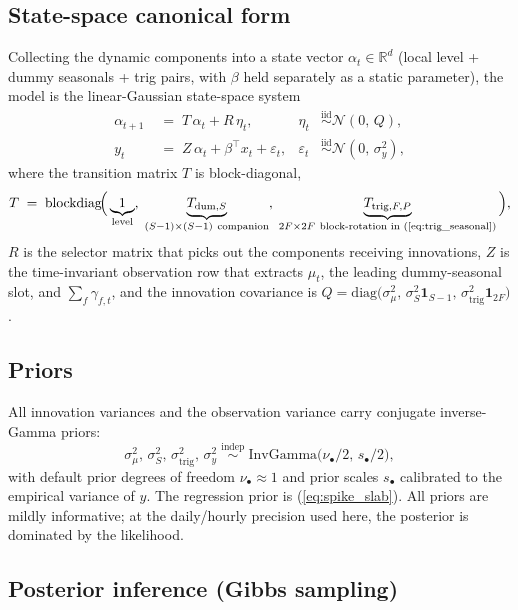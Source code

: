 \documentclass[11pt,a4paper]{article}
\begin{document}
\subsection*{State-space canonical form}

Collecting the dynamic components into a state vector $\alpha_t \in \mathbb{R}^d$ (local level + dummy seasonals + trig pairs, with $\beta$ held separately as a static parameter), the model is the linear-Gaussian state-space system
\begin{align}
\alpha_{t+1} &\;=\; T\, \alpha_t + R\, \eta_t,
& \eta_t &\stackrel{\text{iid}}{\sim} \mathcal{N}(0,\, Q),
\label{eq:ssm_state}\\
y_t &\;=\; Z\, \alpha_t + \beta^{\!\top} x_t + \varepsilon_t,
& \varepsilon_t &\stackrel{\text{iid}}{\sim} \mathcal{N}(0,\, \sigma_y^2),
\label{eq:ssm_obs}
\end{align}
where the transition matrix $T$ is block-diagonal,
\[
T \;=\; \mathrm{blockdiag}\!\Bigl(\,
\underbrace{1}_{\text{level}},\;
\underbrace{T_{\text{dum},S}}_{(S-1)\times(S-1)\ \text{companion}},\;
\underbrace{T_{\text{trig},F,P}}_{2F\times 2F\ \text{block-rotation in (\ref{eq:trig_seasonal})}}
\,\Bigr),
\]
$R$ is the selector matrix that picks out the components receiving innovations, $Z$ is the time-invariant observation row that extracts $\mu_t$, the leading dummy-seasonal slot, and $\sum_f \gamma_{f,t}$, and the innovation covariance is $Q = \mathrm{diag}\!\bigl(\sigma_\mu^2,\, \sigma_S^2 \mathbf{1}_{S-1},\, \sigma_{\text{trig}}^2 \mathbf{1}_{2F}\bigr)$.

\subsection*{Priors}

\noindent All innovation variances and the observation variance carry conjugate inverse-Gamma priors:
\[
\sigma_\mu^2,\, \sigma_S^2,\, \sigma_{\text{trig}}^2,\, \sigma_y^2
\;\stackrel{\text{indep}}{\sim}\; \mathrm{InvGamma}\!\bigl(\nu_{\bullet}/2,\, s_{\bullet}/2\bigr),
\]
with default prior degrees of freedom $\nu_{\bullet} \approx 1$ and prior scales $s_{\bullet}$ calibrated to the empirical variance of $y$. The regression prior is (\ref{eq:spike_slab}). All priors are mildly informative; at the daily/hourly precision used here, the posterior is dominated by the likelihood.

\subsection*{Posterior inference (Gibbs sampling)}
\end{document}
